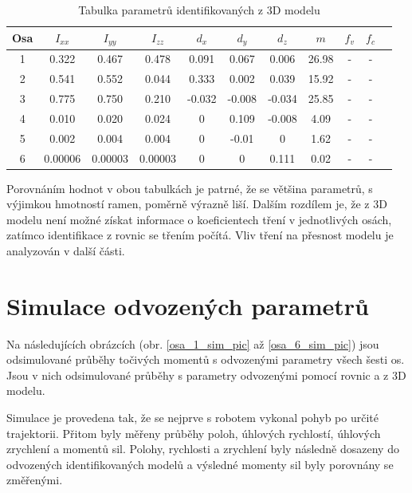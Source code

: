 \begin{table}[htbp]
  \centering
  \caption{Tabulka parametrů identifikovaných z 3D modelu}
    \begin{tabular}{c|cccccccccc}
    \multicolumn{1}{c|}{Osa} & \multicolumn{1}{c}{$I_{xx}$} & \multicolumn{1}{c}{$I_{yy}$} & \multicolumn{1}{c}{$I_{zz}$} & \multicolumn{1}{c}{$d_x$} & \multicolumn{1}{c}{$d_y$} & \multicolumn{1}{c}{$d_z$} & \multicolumn{1}{c}{$m$} & \multicolumn{1}{c}{$f_v$} & \multicolumn{1}{c}{$f_c$} \\
    \hline
    1  & 0.322   & 0.467   & 0.478   & 0.091 & 0.067 & 0.006 & 26.98 & - & - \\
    2  & 0.541   & 0.552   & 0.044   & 0.333 & 0.002 & 0.039 & 15.92 & - & - \\
    3  & 0.775   & 0.750   & 0.210   &-0.032 &-0.008 &-0.034 & 25.85 & - & - \\
    4  & 0.010   & 0.020   & 0.024   & 0     & 0.109 &-0.008 & 4.09  & - & - \\
    5  & 0.002   & 0.004   & 0.004   & 0     &-0.01  & 0     & 1.62  & - & - \\
    6  & 0.00006 & 0.00003 & 0.00003 & 0     & 0     & 0.111 & 0.02  & - & - \\
    \end{tabular}%
  \label{tab_ind_hodnot_3d}%
\end{table}%

Porovnáním hodnot v obou tabulkách je patrné, že se většina parametrů, s výjimkou hmotností ramen, poměrně výrazně liší. Dalším rozdílem je, že z 3D modelu není možné získat informace o koeficientech tření v jednotlivých osách, zatímco identifikace z rovnic se třením počítá. Vliv tření na přesnost modelu je analyzován v další části.

\section{Simulace odvozených parametrů}

Na následujících obrázcích (obr. \ref{osa_1_sim_pic} až \ref{osa_6_sim_pic}) jsou odsimulované průběhy točivých momentů s odvozenými parametry všech šesti os. Jsou v nich odsimulované průběhy s parametry odvozenými pomocí rovnic a z 3D modelu. 

Simulace je provedena tak, že se nejprve s robotem vykonal pohyb po určité trajektorii. Přitom byly měřeny průběhy poloh, úhlových rychlostí, úhlových zrychlení a momentů sil. Polohy, rychlosti a zrychlení byly následně dosazeny do odvozených identifikovaných modelů a výsledné momenty sil byly porovnány se změřenými.

